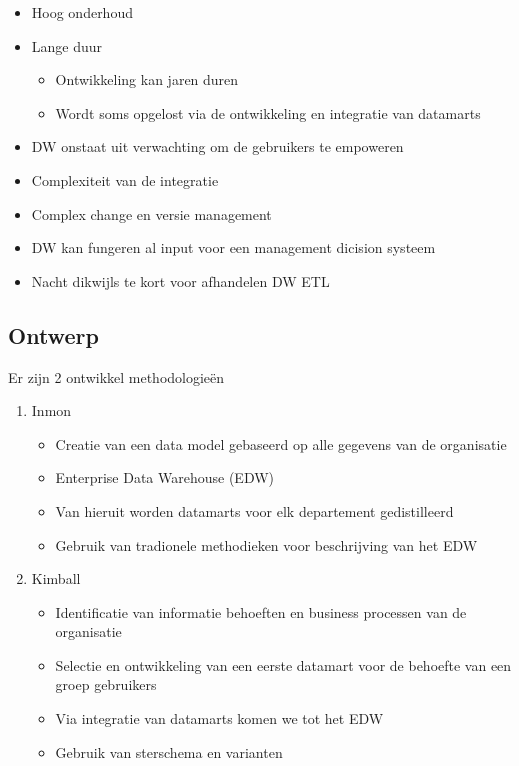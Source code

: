 \documentclass[a4paper,12pt]{article}
\begin{document}
\begin{itemize}
\begin{itemize}
	\end{itemize}
\item Hoog onderhoud
\item Lange duur
	\begin{itemize}
	\item Ontwikkeling kan jaren duren
	\item Wordt soms opgelost via de ontwikkeling en integratie van datamarts
	\end{itemize}
\item DW onstaat uit verwachting om de gebruikers te empoweren
\item Complexiteit van de integratie
\item Complex change en versie management
\item DW kan fungeren al input voor een management dicision systeem
\item Nacht dikwijls te kort voor afhandelen DW ETL
\end{itemize}

\subsection{Ontwerp}
Er zijn 2 ontwikkel methodologieën
\begin{enumerate}
\item Inmon
	\begin{itemize}
	\item Creatie van een data model gebaseerd op alle gegevens van de organisatie
	\item Enterprise Data Warehouse (EDW)
	\item Van hieruit worden datamarts voor elk departement gedistilleerd
	\item Gebruik van tradionele methodieken voor beschrijving van het EDW
	\end{itemize}
\item Kimball
	\begin{itemize}
	\item Identificatie van informatie behoeften en business processen van de organisatie
	\item Selectie en ontwikkeling van een eerste datamart voor de behoefte van een groep gebruikers
	\item Via integratie van datamarts komen we tot het EDW
	\item Gebruik van sterschema en varianten
	\end{itemize}
\end{enumerate}
\end{document}
